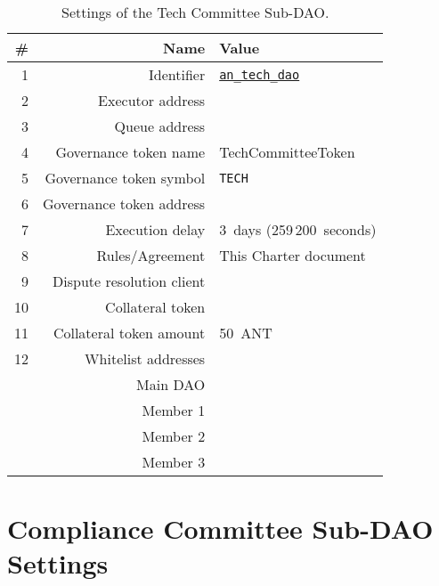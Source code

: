 \begin{table}[h!]
	\caption{Settings of the Tech Committee Sub-DAO.}
	\centering
	\begin{tabular}{rrl}
		\toprule
		\# & Name & Value \\
		\midrule
		 1 & Identifier					& \href{https://govern.aragon.org/\#/daos/an_tech_dao}{\texttt{an\_tech\_dao}}\\
		 2 & Executor address			& \techSubDaoAddr\\
		 3 & Queue address				& \techSubDaoQueueAddr\\
		 4 & Governance token name		& TechCommitteeToken\\
		 5 & Governance token symbol	& \texttt{TECH}\\
		 6 & Governance token address	& \techSubDaoTokenAddr\\
		 7 & Execution delay			& 3~days (259\,200~seconds)\\
		 8 & Rules/Agreement			& This Charter document\\
		 9 & Dispute resolution client	& \aragonCourtAddr\\
		10 & Collateral token			& \antTokenAddr\\
		11 & Collateral token amount	& 50~\ac{ANT}\\
		12 & Whitelist addresses 		& \\
			& Main \ac{DAO} 			& \mainDaoAddr\\
			& Member 1 					& \techSubDaoMemberAddrI\\
			& Member 2 					& \techSubDaoMemberAddrII\\
			& Member 3 					& \techSubDaoMemberAddrIII\\
		\bottomrule
	\end{tabular}
\end{table}

\clearpage

\section{Compliance Committee Sub-DAO Settings}

